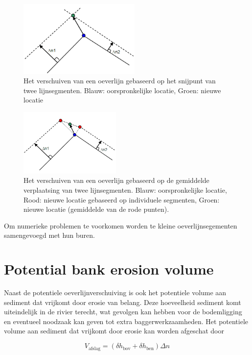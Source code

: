 \begin{figure}
\includegraphics[width=6cm]{figures/Fig4-3.png}
\caption{Het verschuiven van een oeverlijn gebaseerd op het snijpunt van twee lijnsegmenten.
Blauw: oorspronkelijke locatie, Groen: nieuwe locatie}
\label{Fig4.3}
\end{figure}

\begin{figure}
\includegraphics[width=5cm]{figures/Fig4-4.png}
\caption{Het verschuiven van een oeverlijn gebaseerd op de gemiddelde verplaatsing van twee lijnsegmenten.
Blauw: oorspronkelijke locatie, Rood: nieuwe locatie gebaseerd op individuele segmenten, Groen: nieuwe locatie (gemiddelde van de rode punten).}
\label{Fig4.4}
\end{figure}

Om numerieke problemen te voorkomen worden te kleine oeverlijnsegementen samengevoegd met hun buren.

\section{Potential bank erosion volume}

Naast de potentiele oeverlijnverschuiving is ook het potentiele volume aan sediment dat vrijkomt door erosie van belang.
Deze hoeveelheid sediment komt uiteindelijk in de rivier terecht, wat gevolgen kan hebben voor de bodemligging en eventueel noodzaak kan geven tot extra baggerwerkzaamheden.
Het potentiele volume aan sediment dat vrijkomt door erosie kan worden afgeschat door

\begin{equation}
V_\text{afslag} = ( \delta h_\text{bov} + \delta h_\text{ben} ) \Delta n
\end{equation}

